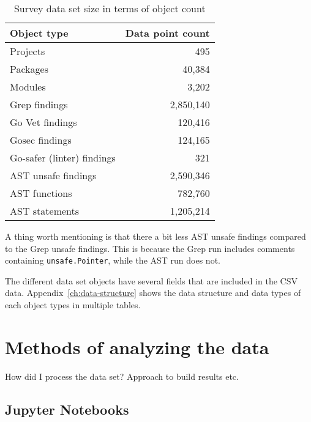\begin{table}[h]
    \centering
    \caption{Survey data set size in terms of object count}
    \label{tbl:survey-dataset-size}
    \begin{tabular}{lr}
        \toprule
        Object type & Data point count \\
        \midrule
        Projects & 495 \\
        Packages & 40,384 \\
        Modules & 3,202 \\
        Grep findings & 2,850,140 \\
        Go Vet findings & 120,416 \\
        Gosec findings & 124,165 \\
        Go-safer (linter) findings & 321 \\
        AST unsafe findings & 2,590,346 \\
        AST functions & 782,760 \\
        AST statements & 1,205,214 \\
        \bottomrule
    \end{tabular}
\end{table}

A thing worth mentioning is that there a bit less AST unsafe findings compared to the Grep unsafe findings.
This is because the Grep run includes comments containing \texttt{unsafe.Pointer}, while the AST run does not.

The different data set objects have several fields that are included in the CSV data.
Appendix~\ref{ch:data-structure} shows the data structure and data types of each object types in multiple tables.



\section{Methods of analyzing the data}\label{sec:survey-analysis-methods}

How did I process the data set?
Approach to build results etc.



\subsection{Jupyter Notebooks}\label{subsec:survey-jupyter}

